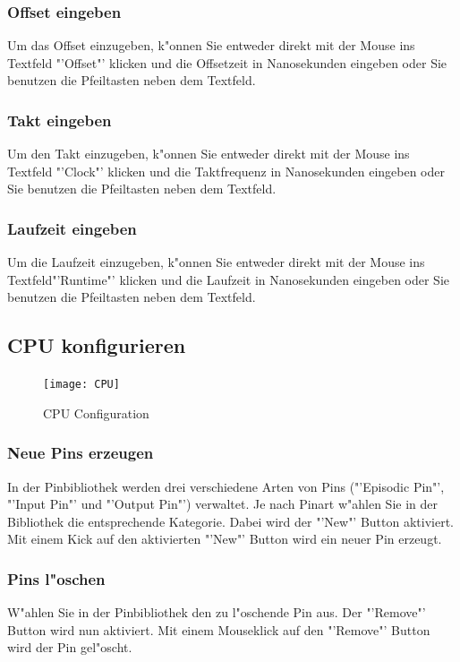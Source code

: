 \documentclass[a4paper,titlepage,12pt,ngerman]{scrbook}
\begin{document}
\subsubsection{Offset eingeben}
Um das Offset einzugeben, k"onnen Sie entweder direkt mit der Mouse ins Textfeld "'Offset"' klicken und die Offsetzeit in Nanosekunden eingeben oder Sie benutzen die Pfeiltasten neben dem Textfeld. 
\subsubsection{Takt eingeben}
Um den Takt einzugeben, k"onnen Sie entweder direkt mit der Mouse ins Textfeld "'Clock"' klicken und die Taktfrequenz in Nanosekunden eingeben oder Sie benutzen die Pfeiltasten neben dem Textfeld. 
\subsubsection{Laufzeit eingeben}
Um die Laufzeit einzugeben, k"onnen Sie entweder direkt mit der Mouse ins Textfeld"'Runtime"' klicken und die Laufzeit in Nanosekunden eingeben oder Sie benutzen die Pfeiltasten neben dem Textfeld. 




\subsection{CPU konfigurieren}
\begin{figure}[htbp]
\begin{center}
\texttt{[image: CPU]}
\caption{CPU Configuration}\label{test}
\end{center}
\end{figure}
\subsubsection{Neue Pins erzeugen}
In der Pinbibliothek werden drei verschiedene Arten von Pins ("'Episodic Pin"', "'Input Pin"' und "'Output Pin"') verwaltet. Je nach Pinart w"ahlen Sie in der Bibliothek die entsprechende Kategorie. Dabei wird der "'New"' Button aktiviert. Mit einem Kick auf den aktivierten "'New"' Button wird ein neuer Pin erzeugt. \par
\subsubsection{Pins l"oschen}
W"ahlen Sie in der Pinbibliothek den zu l"oschende Pin aus. Der "'Remove"' Button wird nun aktiviert. Mit einem Mouseklick auf den "'Remove"' Button wird der Pin gel"oscht.
\end{document}
